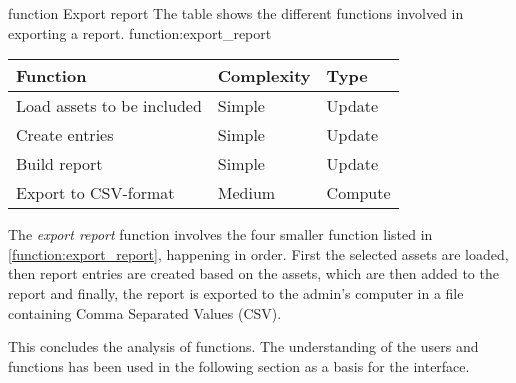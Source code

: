 \fancyLayout
    {function}
    {Export report}
    {The table shows the different functions involved in exporting a report.}
    {function:export_report}
    {
        \centering
        \begin{tabular}{|l|l|l|}
            \hline
            \textbf{Function} & \textbf{Complexity} & \textbf{Type}\\
            \hline
            \hline
            Load assets to be included & Simple & Update \\
            \hline
            Create entries & Simple & Update \\
            \hline
            Build report & Simple & Update \\
            \hline
            Export to CSV-format & Medium & Compute \\
            \hline
        \end{tabular}
}

The \textit{export report} function involves the four smaller function listed in \autoref{function:export_report}, happening in order. First the selected assets are loaded, then report entries are created based on the assets, which are then added to the report and finally, the report is exported to the admin's computer in a file containing Comma Separated Values (CSV).
\par
This concludes the analysis of functions. The understanding of the users and functions has been used in the following section as a basis for the interface.
